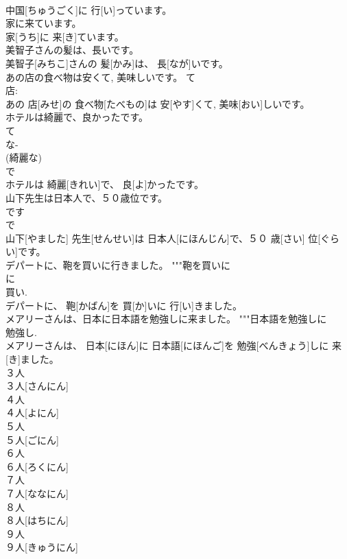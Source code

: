 \documentclass[8pt]{extreport}
\begin{document}
\begin{CJK}{UTF8}{min}
\\	中国[ちゅうごく]に 行[い]っています。		
\\	家に来ています。	
\\	家[うち]に 来[き]ています。	
\\	美智子さんの髪は、長いです。	
\\	美智子[みちこ]さんの 髪[かみ]は、 長[なが]いです。	
\\	あの店の食べ物は安くて, 美味しいです。	て 
\\	店: 
\\	あの 店[みせ]の 食べ物[たべもの]は 安[やす]くて, 美味[おい]しいです。	
\\	ホテルは綺麗で、良かったです。	
\\	て 
\\	な-
\\	(綺麗な) 
\\	で 
\\	ホテルは 綺麗[きれい]で、 良[よ]かったです。	
\\	山下先生は日本人で、５０歳位です。	
\\	です 
\\	で 
\\	[人です]	山下[やました] 先生[せんせい]は 日本人[にほんじん]で、５０ 歳[さい] 位[ぐらい]です。	
\\	デパートに、鞄を買いに行きました。	"""鞄を買いに
\\	に 
\\	買い.
\\	デパートに、 鞄[かばん]を 買[か]いに 行[い]きました。	
\\	メアリーさんは、日本に日本語を勉強しに来ました。	"""日本語を勉強しに
\\	勉強し.
\\	メアリーさんは、 日本[にほん]に 日本語[にほんご]を 勉強[べんきょう]しに 来[き]ました。	
\\	３人	
\\	３人[さんにん]		
\\	４人	
\\	４人[よにん]		
\\	５人	
\\	５人[ごにん]		
\\	６人	
\\	６人[ろくにん]		
\\	７人	
\\	７人[ななにん]		
\\	８人	
\\	８人[はちにん]		
\\	９人	
\\	９人[きゅうにん]		

\end{CJK}
\end{document}
